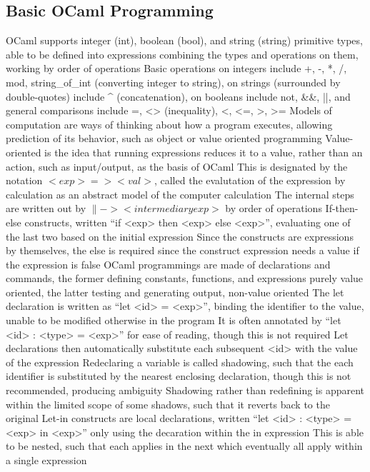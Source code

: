 \documentclass[11 pt, twoside]{article}
\newenvironment{outline*}
{
	\begin{outline}[enumerate]
	}
	{\end{outline}
}
\begin{document}
\subsection{Basic OCaml Programming}
\begin{outline*}
\1 OCaml supports integer (int), boolean (bool), and string (string) primitive types, able to be defined into expressions combining the types and operations on them, working by order of operations
\2 Basic operations on integers include +, -, *, /, mod, string_of_int (converting integer to string), on strings (surrounded by double-quotes) include ^ (concatenation), on booleans include not, &&, ||, and general comparisons include =, <> (inequality), <, <=, >, >=
\1 Models of computation are ways of thinking about how a program executes, allowing prediction of its behavior, such as object or value oriented programming
\2 Value-oriented is the idea that running expressions reduces it to a value, rather than an action, such as input/output, as the basis of OCaml
\2 This is designated by the notation $<exp> => <val>$, called the evalutation of the expression by calculation as an abstract model of the computer calculation
\3 The internal steps are written out by $\|-> <intermediary exp>$ by order of operations
\1 If-then-else constructs, written ``if <exp> then <exp> else <exp>'', evaluating one of the last two based on the initial expression
\2 Since the constructs are expressions by themselves, the else is required since the construct expression needs a value if the expression is false
\1 OCaml programmings are made of declarations and commands, the former defining constants, functions, and expressions purely value oriented, the latter testing and generating output, non-value oriented
\2 The let declaration is written as ``let <id> = <exp>'', binding the identifier to the value, unable to be modified otherwise in the program
\3 It is often annotated by ``let <id> : <type> = <exp>'' for ease of reading, though this is not required
\3 Let declarations then automatically substitute each subsequent <id> with the value of the expression
\3 Redeclaring a variable is called shadowing, such that the each identifier is substituted by the nearest enclosing declaration, though this is not recommended, producing ambiguity
\4 Shadowing rather than redefining is apparent within the limited scope of some shadows, such that it reverts back to the original
\2 Let-in constructs are local declarations, written ``let <id> : <type> = <exp> in <exp>'' only using the decaration within the in expression
\3 This is able to be nested, such that each applies in the next which eventually all apply within a single expression

\end{outline*}
\end{document}
